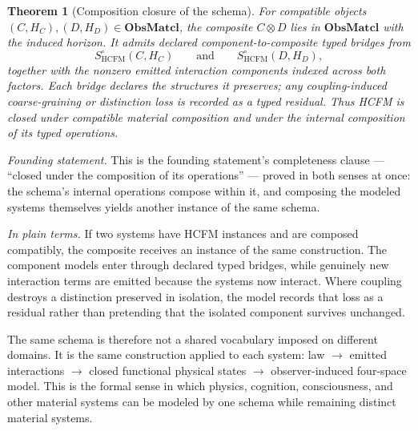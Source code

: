 \documentclass[11pt]{article}
\newtheorem{theorem}{Theorem}
\theoremstyle{definition}
\newcommand{\ObsMatcl}{\mathbf{ObsMatcl}}
\newcommand{\plainterms}{\emph{In plain terms.}}
\newcommand{\founding}{\emph{Founding statement.}}
\begin{document}
\begin{theorem}[Composition closure of the schema] \label{thm:composition-closure} For compatible objects \((C,H_C),(D,H_D)\in\ObsMatcl\), the composite \(C\otimes D\) lies in \(\ObsMatcl\) with the induced horizon. It admits declared component-to-composite typed bridges from \[ S^{\circ}_{\mathrm{HCFM}}(C,H_C) \qquad\text{and}\qquad S^{\circ}_{\mathrm{HCFM}}(D,H_D), \] together with the nonzero emitted interaction components indexed across both factors. Each bridge declares the structures it preserves; any coupling-induced coarse-graining or distinction loss is recorded as a typed residual. Thus HCFM is closed under compatible material composition and under the internal composition of its typed operations. 
\end{theorem}

\noindent\founding{} This is the founding statement's completeness clause --- ``closed under the composition of its operations'' --- proved in both senses at once: the schema's internal operations compose within it, and composing the modeled systems themselves yields another instance of the same schema.

\noindent\plainterms{} If two systems have HCFM instances and are composed compatibly, the composite receives an instance of the same construction. The component models enter through declared typed bridges, while genuinely new interaction terms are emitted because the systems now interact. Where coupling destroys a distinction preserved in isolation, the model records that loss as a residual rather than pretending that the isolated component survives unchanged.

The same schema is therefore not a shared vocabulary imposed on different domains. It is the same construction applied to each system: law $\to$ emitted interactions $\to$ closed functional physical states $\to$ observer-induced four-space model. This is the formal sense in which physics, cognition, consciousness, and other material systems can be modeled by one schema while remaining distinct material systems.
\end{document}
